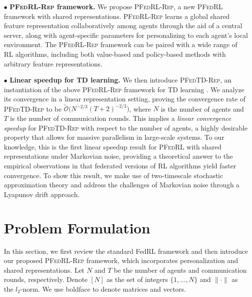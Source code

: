 \documentclass{article} %
\theoremstyle{plain}
\theoremstyle{definition}
\theoremstyle{remark}
\newcommand{\PFRL}{\textsc{PFedRL}\xspace}
\newcommand{\FedRL}{\textsc{PFedRL-Rep}\xspace}
\newcommand{\FedTD}{\textsc{PFedTD-Rep}\xspace}
\begin{document}
\noindent$\bullet$ \textbf{\FedRL framework.} We propose \FedRL, a new \PFRL framework with shared representations. \FedRL learns a global shared feature representation collaboratively among agents through the aid of a central server, along with agent-specific parameters for personalizing to each agent's local environment. The \FedRL framework can be paired with a wide range of RL algorithms, including both value-based and policy-based methods with arbitrary feature representations.


\noindent$\bullet$ \textbf{Linear speedup for TD learning.} We then introduce \FedTD, an instantiation of the above \FedRL framework for TD learning \citep{sutton2018reinforcement}. We analyze its convergence in a linear representation setting, proving the convergence rate of \FedTD to be $\tilde{\mathcal{O}}\bigl(N^{-2/3}(T+2)^{-2/3}\bigr)$, where $N$ is the number of agents and $T$ is the number of communication rounds. This implies a \emph{linear convergence speedup} for \FedTD with respect to the number of agents, a highly desirable property that allows for massive parallelism in large-scale systems. To our knowledge, this is the first linear speedup result for \PFRL with shared representations under Markovian noise, providing a theoretical answer to the empirical observations in \cite{mnih2016asynchronous} that federated versions of RL algorithms yield faster convergence. To show this result, we make use of two-timescale stochastic approximation theory and address the challenges of Markovian noise through a Lyapunov drift approach.







\section{Problem Formulation}\label{prelim}


In this section, we first review the standard FedRL framework and then introduce our proposed \FedRL framework, which incorporates personalization and shared representations. Let $N$ and $T$ be the number of agents and communication rounds, respectively.  Denote $[N]$ as the set of integers $\{1,\ldots, N\}$ and $\|\cdot\|$ as  the $l_2$-norm.  We use boldface to denote matrices and vectors.

\vspace{-0.05in}
\end{document}
